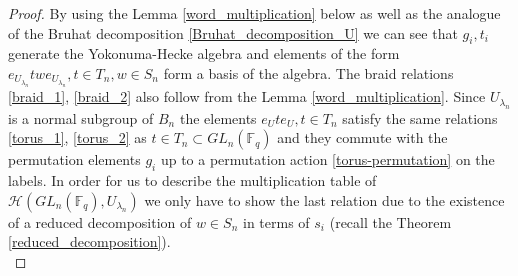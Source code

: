 \documentclass[12pt,reqno]{amsart}
\theoremstyle{definition}
\theoremstyle{remark}
\numberwithin{equation}{section}
\newcommand{\GL}[1]{GL_{#1}(\mathbb{F}_q)}
\begin{document}
\begin{proof}
    By using the Lemma \ref{word_multiplication} below as well as the analogue of the Bruhat decomposition \eqref{Bruhat_decomposition_U} we can see that $g_i,t_i$ generate the Yokonuma-Hecke algebra and elements of the form $e_{U_{\lambda_n}} t w e_{U_{\lambda_n}}, t\in T_n,w\in S_n$ form a basis of the algebra. The braid relations \eqref{braid_1}, \eqref{braid_2} also follow from the Lemma \ref{word_multiplication}. Since $U_{\lambda_n}$ is a normal subgroup of $B_n$ the elements $e_Ute_U,t\in T_n$ satisfy the same relations \eqref{torus_1}, \eqref{torus_2} as $t\in T_n\subset \GL{n}$ and they commute with the permutation elements $g_i$ up to a permutation action \eqref{torus-permutation} on the labels. In order for us to describe the multiplication table of $\mathcal{H}(\GL{n},U_{\lambda_n})$ we only have to show the last relation due to the existence of a reduced decomposition of $w\in S_n$ in terms of $s_i$ (recall the Theorem \ref{reduced_decomposition}). \\









\end{proof}
\end{document}
